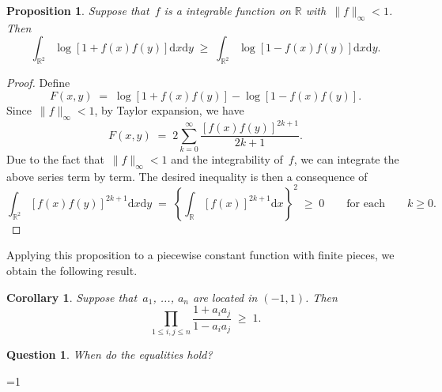 \documentclass[12pt,a4paper]{article}  %
\newcommand{\bibfile}{\jobname.bib}  %
\newcommand{\iscite}{0}  %
\newtheorem{corollary}{Corollary}%
\newtheorem{proposition}{Proposition}%
\newtheorem{question}{Question}%
\theoremstyle{definition}
\numberwithin{equation}{section}
\newcommand{\RR}{\mathbb{R}}
\newcommand{\md}{\mathrm{d}}
\begin{document}




\begin{proposition}
    \label{prop:int}
    Suppose that~$f$ is a integrable function on $\RR$ with~$\|f\|_\infty <1$. Then
    \begin{equation*}
        \int_{\RR^2} \log \left[ 1 + f(x)f(y) \right] \md x \md y
        \;\ge\; \int_{\RR^2} \log \left[ 1 - f(x)f(y) \right] \md x \md y.
    \end{equation*}
\end{proposition}

\begin{proof}
    Define
    \begin{equation*}
        F(x,y) \;=\; \log \left[ 1 + f(x)f(y) \right] - \log \left[ 1 - f(x)f(y) \right].
    \end{equation*}
    Since~$\|f\|_\infty < 1$,  by Taylor expansion, we have
    \begin{equation*}
        F(x,y) \;=\;  2\sum_{k=0}^\infty \frac{[f(x)f(y)]^{2k+1}}{2k+1}.
    \end{equation*}
    Due to the fact that~$\|f\|_\infty<1$ and the integrability of~$f$, we can integrate the above series term by term. The desired
    inequality is then a consequence of
    \begin{equation*}
        \int_{\RR^2}[f(x)f(y)]^{2k+1} \md x \md y \;=\; \left\{\int_{\RR}[f(x)]^{2k+1} \md x\right\}^2
        \;\ge\; 0
    \qquad\text{for each} \qquad k\ge 0.
    \end{equation*}
\end{proof}

Applying this proposition to a piecewise constant function with finite pieces, we obtain the following result.

\begin{corollary}
    \label{coro:sum}
    Suppose that~$a_1$, ..., $a_n$ are located in $(-1, 1)$. Then
    \begin{equation*}
        \prod_{1\le i, j\le n} \frac{1+a_ia_j}{1-a_ia_j} \;\ge\;1.
    \end{equation*}
\end{corollary}

\begin{question}
    When do the equalities hold?
\end{question}



\ifnum\iscite=1
    \small
    
    
\fi

\end{document}

